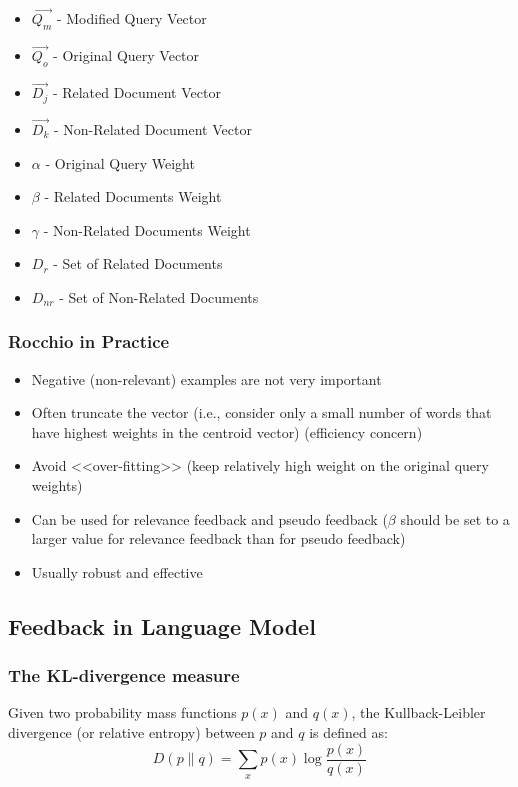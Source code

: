 \begin{itemize}
\item $\overrightarrow{Q_m}$ - Modified Query Vector
\item $\overrightarrow{Q_o}$ - Original Query Vector
\item $\overrightarrow{D_j}$ - Related Document Vector
\item $\overrightarrow{D_k}$ - Non-Related Document Vector
\item $\alpha$ - Original Query Weight
\item $\beta$ - Related Documents Weight
\item $\gamma$ - Non-Related Documents Weight
\item $D_r$ - Set of Related Documents
\item $D_{nr}$ - Set of Non-Related Documents
\end{itemize}

\subsubsection{Rocchio in Practice}
\begin{itemize}
\item Negative (non-relevant) examples are not very important
\item Often truncate the vector (i.e., consider only a small number of words that have highest weights in the centroid vector) (efficiency concern)
\item Avoid <<over-fitting>> (keep relatively high weight on the original query weights)
\item Can be used for relevance feedback and pseudo feedback ($\beta$ should be set to a larger value for relevance feedback than for pseudo feedback)
\item Usually robust and effective
\end{itemize}


\subsection{Feedback in Language Model}

\subsubsection{The KL-divergence measure}
Given two probability mass functions $p(x)$ and $q(x)$, the Kullback-Leibler divergence (or relative entropy) between $p$ and $q$ is defined as:
\begin{equation*}
D(p \parallel q) = \sum_x p(x) \log \frac{p(x)}{q(x)}
\end{equation*}

